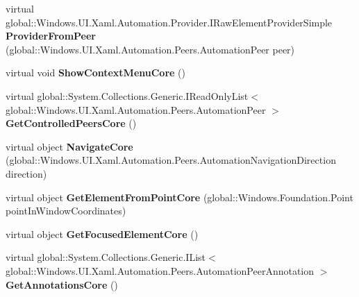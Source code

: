 \begin{DoxyCompactItemize}
virtual global\+::\+Windows.\+U\+I.\+Xaml.\+Automation.\+Provider.\+I\+Raw\+Element\+Provider\+Simple {\bfseries Provider\+From\+Peer} (global\+::\+Windows.\+U\+I.\+Xaml.\+Automation.\+Peers.\+Automation\+Peer peer)
\item 
\mbox{\label{class_windows_1_1_u_i_1_1_xaml_1_1_automation_1_1_peers_1_1_automation_peer_a4cf8c7b7bc669694fbf6115b9d508e66}} 
virtual void {\bfseries Show\+Context\+Menu\+Core} ()
\item 
\mbox{\label{class_windows_1_1_u_i_1_1_xaml_1_1_automation_1_1_peers_1_1_automation_peer_a7554757fd9d004f2179de9d68645070c}} 
virtual global\+::\+System.\+Collections.\+Generic.\+I\+Read\+Only\+List$<$ global\+::\+Windows.\+U\+I.\+Xaml.\+Automation.\+Peers.\+Automation\+Peer $>$ {\bfseries Get\+Controlled\+Peers\+Core} ()
\item 
\mbox{\label{class_windows_1_1_u_i_1_1_xaml_1_1_automation_1_1_peers_1_1_automation_peer_afd50c2697f066ad333995dc06a907be4}} 
virtual object {\bfseries Navigate\+Core} (global\+::\+Windows.\+U\+I.\+Xaml.\+Automation.\+Peers.\+Automation\+Navigation\+Direction direction)
\item 
\mbox{\label{class_windows_1_1_u_i_1_1_xaml_1_1_automation_1_1_peers_1_1_automation_peer_ae8260393672adea30e509cee8106d5ef}} 
virtual object {\bfseries Get\+Element\+From\+Point\+Core} (global\+::\+Windows.\+Foundation.\+Point point\+In\+Window\+Coordinates)
\item 
\mbox{\label{class_windows_1_1_u_i_1_1_xaml_1_1_automation_1_1_peers_1_1_automation_peer_afadb1e1f2c9abb79fa5e7189b24f159c}} 
virtual object {\bfseries Get\+Focused\+Element\+Core} ()
\item 
\mbox{\label{class_windows_1_1_u_i_1_1_xaml_1_1_automation_1_1_peers_1_1_automation_peer_ab6f0d05047a23ceac4c1969ba5a531c6}} 
virtual global\+::\+System.\+Collections.\+Generic.\+I\+List$<$ global\+::\+Windows.\+U\+I.\+Xaml.\+Automation.\+Peers.\+Automation\+Peer\+Annotation $>$ {\bfseries Get\+Annotations\+Core} ()

\end{DoxyCompactItemize}
